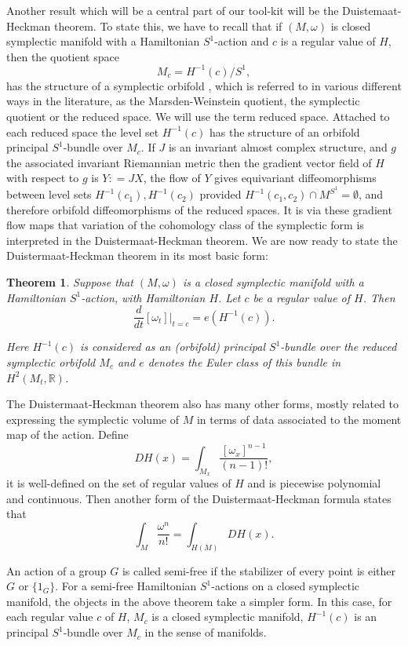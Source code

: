 \documentclass[12pt]{article}
\newtheorem{theorem}{Theorem}[section]
\begin{document}
Another result which will be a central part of our tool-kit will be the Duistemaat-Heckman theorem. To state this, we have to recall that if $(M,\omega)$ is closed symplectic manifold with a Hamiltonian $S^1$-action and $c$ is a regular value of $H$, then the quotient space $$M_{c} = H^{-1}(c)/S^1,$$ has the structure of a symplectic orbifold \cite[Lemma 5.35]{MS}, which is referred to in various different ways in the literature, as the Marsden-Weinstein quotient, the symplectic quotient or the reduced space. We will use the term reduced space. Attached to each reduced space the level set $H^{-1}(c)$ has the structure of an orbifold principal $S^1$-bundle over $M_{c}.$ If $J$ is an invariant almost complex structure, and $g$ the associated invariant Riemannian metric then the gradient vector field of $H$ with respect to $g$ is $Y : =JX$, the flow of $Y$ gives equivariant diffeomorphisms between level sets $H^{-1}(c_1),H^{-1}(c_2)$ provided $H^{-1}(c_1,c_2) \cap M^{S^1} = \emptyset$, and therefore orbifold diffeomorphisms of the reduced spaces. It is via these gradient flow maps that variation of the cohomology class of the symplectic form is interpreted in the Duistermaat-Heckman theorem. We are now ready to state the Duistermaat-Heckman theorem in its most basic form:

\begin{theorem} \label{dhthe} \cite[Theorem 1.1]{DH}
Suppose that $(M,\omega)$ is a closed symplectic manifold with a Hamiltonian $S^1$-action, with Hamiltonian $H$. Let $c$ be a regular value of $H$. Then $$\frac{d}{dt}[\omega_t] |_{t=c}= e(H^{-1}(c)) .$$ 

Here $H^{-1}(c)$ is considered as an (orbifold) principal $S^1$-bundle over the reduced symplectic orbifold $M_{c}$ and $e$ denotes the Euler class of this bundle in $H^{2}(M_{t},\mathbb{R})$.
\end{theorem}

The Duistermaat-Heckman theorem also has many other forms, mostly related to expressing the symplectic volume of $M$ in terms of data associated to the moment map of the action. Define $$DH(x) = \int_{M_{x}} \frac{[\omega_x]^{n-1}}{(n-1)!} ,$$ it is well-defined on the set of regular values of $H$ and is piecewise polynomial and continuous. Then another form of the Duistermaat-Heckman formula states that \begin{equation}\label{dhformula} \int_{M} \frac{\omega^n}{n!} = \int_{H(M)} DH(x). \end{equation}

An action of a group $G$ is called semi-free if the stabilizer of every point is either $G$ or $\{1_G\}$. For a semi-free Hamiltonian $S^1$-actions on a closed symplectic manifold, the  objects in the above theorem take a simpler form. In this case, for each regular value $c$ of $H$, $M_{c}$ is a closed symplectic manifold, $H^{-1}(c)$ is an principal $S^1$-bundle over $M_{c}$ in the sense of manifolds. 
\end{document}
